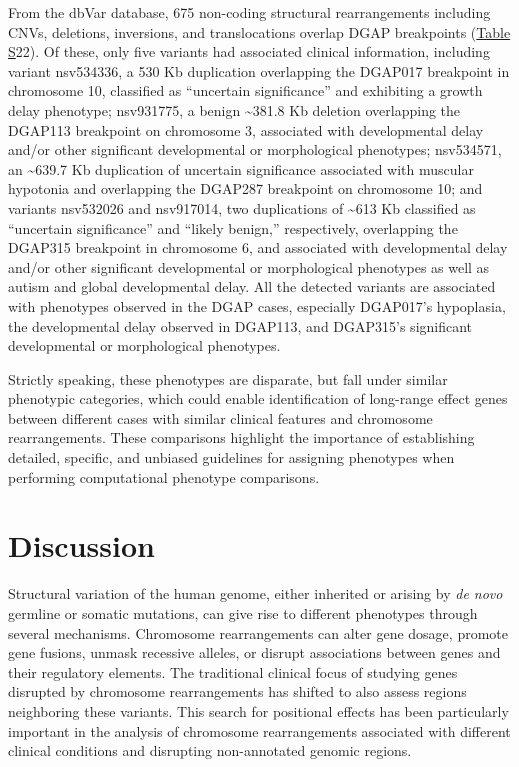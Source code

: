 \documentclass[a4paper,twoside=true,openright,parskip=full,chapterprefix=true,11pt,headings=normal,bibliography=totoc,listof=totoc,titlepage=on,captions=tableabove,draft=false]{scrreprt}
\theoremstyle{definition}
\theoremstyle{definition}
\theoremstyle{definition}
\theoremstyle{remark}
\begin{document}
From the dbVar database, 675 non-coding structural rearrangements
including CNVs, deletions, inversions, and translocations overlap DGAP
breakpoints (\protect\hyperlink{position-effect-sub-tab}{Table S}22). Of
these, only five variants had associated clinical information, including
variant nsv534336, a 530 Kb duplication overlapping the DGAP017
breakpoint in chromosome 10, classified as ``uncertain
significance''\citep{Miller2010} and exhibiting a growth delay
phenotype; nsv931775, a benign \textasciitilde{}381.8 Kb deletion
overlapping the DGAP113 breakpoint on chromosome 3, associated with
developmental delay and/or other significant developmental or
morphological phenotypes;\citep{Miller2010} nsv534571, an
\textasciitilde{}639.7 Kb duplication of uncertain significance
associated with muscular hypotonia and overlapping the DGAP287
breakpoint on chromosome 10; and variants nsv532026 and nsv917014, two
duplications of \textasciitilde{}613 Kb classified as ``uncertain
significance'' and ``likely benign,'' respectively, overlapping the
DGAP315 breakpoint in chromosome 6, and associated with developmental
delay and/or other significant developmental or morphological phenotypes
as well as autism and global developmental delay. All the detected
variants are associated with phenotypes observed in the DGAP cases,
especially DGAP017's hypoplasia, the developmental delay observed in
DGAP113, and DGAP315's significant developmental or morphological
phenotypes.

Strictly speaking, these phenotypes are disparate, but fall under
similar phenotypic categories, which could enable identification of
long-range effect genes between different cases with similar clinical
features and chromosome rearrangements. These comparisons highlight the
importance of establishing detailed, specific, and unbiased guidelines
for assigning phenotypes when performing computational phenotype
comparisons.

\hypertarget{discussion-1}{%
\section{Discussion}\label{discussion-1}}

Structural variation of the human genome, either inherited or arising by
\emph{de novo} germline or somatic mutations, can give rise to different
phenotypes through several mechanisms. Chromosome rearrangements can
alter gene dosage, promote gene fusions, unmask recessive alleles, or
disrupt associations between genes and their regulatory elements. The
traditional clinical focus of studying genes disrupted by chromosome
rearrangements has shifted to also assess regions neighboring these
variants.\citep{Ordulu2016} This search for positional effects has been
particularly important in the analysis of chromosome rearrangements
associated with different clinical conditions and disrupting
non-annotated genomic regions.\citep{Zhang2015, Spielmann2016}
\end{document}
